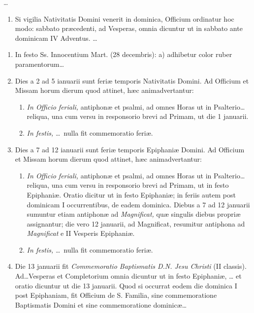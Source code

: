\documentclass[vesperale_romanum.tex]{subfiles}
\begin{document}
…

\begin{enumerate}[nosep,start=19]
\item Si vigilia Nativitatis Domini venerit in dominica, Officium ordinatur hoc modo:  sabbato præcedenti, ad Vesperas, omnia dicuntur ut in sabbato ante dominicam IV Adventus. …
\end{enumerate}

\begin{enumerate}[nosep,start=21]
\item In festo Ss. Innocentium Mart. (28 decembris): a) adhibetur color ruber paramentorum…
\item Dies a 2 ad 5 ianuarii sunt feriæ temporis Nativitatis Domini. Ad Officium et Missam horum dierum quod attinet, hæc animadvertantur:
\begin{enumerate}[nosep,label=\alph*.]
\item \textit{In Officio feriali,} antiphonæ et psalmi, ad omnes Horas ut in Psalterio… reliqua, una cum versu in responsorio brevi ad Primam, ut die 1 januarii.
\item \textit{In festis,} … nulla fit commemoratio feriæ.
\end{enumerate}

 \item Dies a 7 ad 12 ianuarii sunt feriæ temporis Epiphaniæ Domini. Ad Officium et Missam horum dierum quod attinet, hæc animadvertantur:
 \begin{enumerate}[nosep,label=\alph*.]
 \item \textit{In Officio feriali,} antiphonæ et psalmi, ad omnes Horas ut in Psalterio… reliqua, una cum versu in responsorio brevi ad Primam, ut in festo Epiphaniæ. Oratio dicitur ut in festo Epiphaniæ; in feriis autem post dominicam I occurrentibus, de eadem dominica. Diebus a 7 ad 12 januarii sumuntur etiam antiphonæ ad \textit{Magnificat,} quæ singulis diebus propriæ assignantur; die vero 12 januarii, ad Magnificat, resumitur antiphona ad \textit{Magnificat} e II Vesperis Epiphaniæ.
 \item \textit{In festis,} … nulla fit commemoratio feriæ.
 \end{enumerate}
 
\item Die 13 januarii fit \textit{Commemoratio Baptismatis D.N. Jesu Christi} (II classis). Ad…Vesperas et Completorium omnia dicuntur ut in festo Epiphaniæ,  … et oratio dicuntur ut die 13 januarii. Quod si occurrat eodem die dominica I post Epiphaniam, fit Officium de S. Familia, sine commemoratione Baptismatis Domini et sine commemoratione dominicæ…
\end{enumerate}
\end{document}
